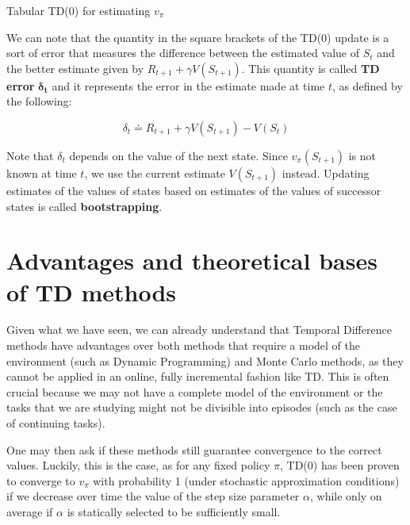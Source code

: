 \begin{algorithm}[H]
\DontPrintSemicolon
\SetAlgoVlined
{}
\Parameters{step size $\alpha \in \left] 0,1 \right]$}

\caption{Tabular TD(0) for estimating $v_\pi$}
\end{algorithm}

We can note that the quantity in the square brackets of the TD(0) update is a sort of error that measures the difference between the estimated value of $S_t$ and the better estimate given by $R_{t+1} + \gamma V(S_{t+1})$. This quantity is called \textbf{TD error} $\boldsymbol{\delta_t}$ and it represents the error in the estimate made at time $t$, as defined by the following:

\begin{equation}
    \delta_t \doteq R_{t+1} + \gamma V(S_{t+1}) - V(S_t)
    \label{eq:ch5-tderrordeltat}
\end{equation}

Note that $\delta_t$ depends on the value of the next state. Since $v_{\pi}(S_{t+1})$ is not known at time $t$, we use the current estimate $V(S_{t+1})$ instead. Updating estimates of the values of states based on estimates of the values of successor states is called \textbf{bootstrapping}.

\section{Advantages and theoretical bases of TD methods}
Given what we have seen, we can already understand that Temporal Difference methods have advantages over both methods that require a model of the environment (such as Dynamic Programming) and Monte Carlo methods, as they cannot be applied in an online, fully incremental fashion like TD. This is often crucial because we may not have a complete model of the environment or the tasks that we are studying might not be divisible into episodes (such as the case of continuing tasks).

One may then ask if these methods still guarantee convergence to the correct values. Luckily, this is the case, as for any fixed policy $\pi$, TD(0) has been proven to converge to $v_\pi$ with probability 1 (under stochastic approximation conditions) if we decrease over time the value of the step size parameter $\alpha$, while only on average if $\alpha$ is statically selected to be sufficiently small.

